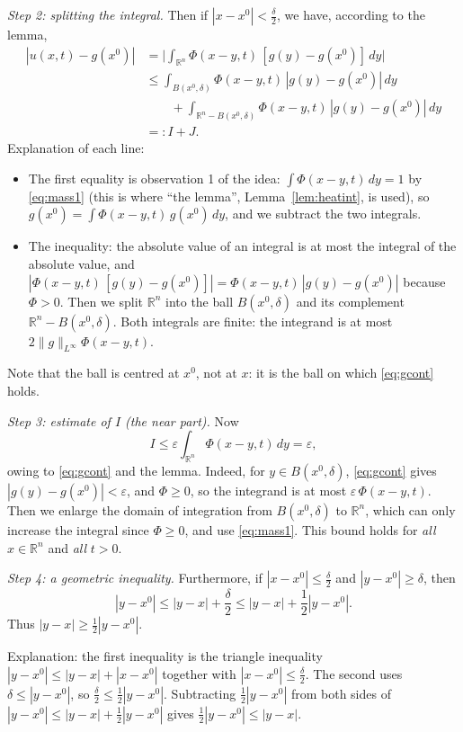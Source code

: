 \documentclass[11pt]{article}
\theoremstyle{plain}
\theoremstyle{definition}
\theoremstyle{remark}
\begin{document}
\emph{Step 2: splitting the integral.} Then if $|x - x^0| < \frac\delta2$, we have, according to the lemma,
\begin{align*}
|u(x,t) - g(x^0)| &= \Big|\int_{\mathbb{R}^n}\Phi(x - y,t)\,[g(y) - g(x^0)]\, dy\Big| \\
&\leq \int_{B(x^0,\delta)}\Phi(x-y,t)\,|g(y) - g(x^0)|\, dy \\
&\qquad + \int_{\mathbb{R}^n - B(x^0,\delta)}\Phi(x-y,t)\,|g(y) - g(x^0)|\, dy \\
&=: I + J.
\end{align*}
Explanation of each line:
\begin{itemize}
    \item The first equality is observation 1 of the idea: $\int\Phi(x-y,t)\,dy = 1$ by \eqref{eq:mass1} (this is where ``the lemma'', Lemma~\ref{lem:heatint}, is used), so $g(x^0) = \int\Phi(x-y,t)\,g(x^0)\,dy$, and we subtract the two integrals.
    \item The inequality: the absolute value of an integral is at most the integral of the absolute value, and $|\Phi(x - y,t)\,[g(y) - g(x^0)]| = \Phi(x-y,t)\,|g(y) - g(x^0)|$ because $\Phi > 0$. Then we split $\mathbb{R}^n$ into the ball $B(x^0,\delta)$ and its complement $\mathbb{R}^n - B(x^0,\delta)$. Both integrals are finite: the integrand is at most $2\|g\|_{L^\infty}\Phi(x-y,t)$.
\end{itemize}
Note that the ball is centred at $x^0$, not at $x$: it is the ball on which \eqref{eq:gcont} holds.

\emph{Step 3: estimate of $I$ (the near part).} Now
$$ I \leq \varepsilon\int_{\mathbb{R}^n}\Phi(x - y,t)\, dy = \varepsilon, $$
owing to \eqref{eq:gcont} and the lemma. Indeed, for $y \in B(x^0,\delta)$, \eqref{eq:gcont} gives $|g(y) - g(x^0)| < \varepsilon$, and $\Phi \geq 0$, so the integrand is at most $\varepsilon\,\Phi(x - y,t)$. Then we enlarge the domain of integration from $B(x^0,\delta)$ to $\mathbb{R}^n$, which can only increase the integral since $\Phi \ge 0$, and use \eqref{eq:mass1}. This bound holds for \emph{all} $x \in \mathbb{R}^n$ and \emph{all} $t > 0$.

\emph{Step 4: a geometric inequality.} Furthermore, if $|x - x^0| \leq \frac\delta2$ and $|y - x^0| \geq \delta$, then
$$ |y - x^0| \leq |y - x| + \frac\delta2 \leq |y - x| + \frac12|y - x^0|. $$
Thus $|y - x| \geq \frac12|y - x^0|$.

Explanation: the first inequality is the triangle inequality $|y - x^0| \leq |y - x| + |x - x^0|$ together with $|x - x^0| \leq \frac\delta2$. The second uses $\delta \leq |y - x^0|$, so $\frac\delta2 \leq \frac12|y - x^0|$. Subtracting $\frac12|y - x^0|$ from both sides of $|y - x^0| \leq |y - x| + \frac12|y-x^0|$ gives $\frac12|y - x^0| \leq |y - x|$.
\end{document}
